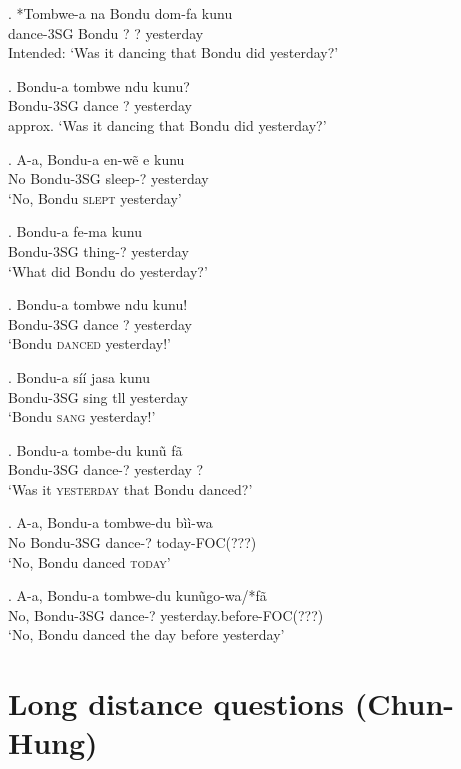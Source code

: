 \documentclass{assets/fieldnotes}
\begin{document}
{\exg. *Tombwe-a na Bondu dom-fa kunu\\
dance-3SG Bondu ? ? yesterday\\
Intended: `Was it dancing that Bondu did yesterday?'\\

\exg. Bondu-a tombwe ndu kunu?\\
Bondu-3SG dance ? yesterday\\
approx. `Was it dancing that Bondu did yesterday?'

\exg. A-a, Bondu-a en-wẽ e kunu\\
No Bondu-3SG sleep-? yesterday\\
`No, Bondu \textsc{slept} yesterday'

\exg. Bondu-a fe-ma kunu\\
Bondu-3SG thing-? yesterday\\
`What did Bondu do yesterday?'


\exg. Bondu-a tombwe ndu kunu!\\
Bondu-3SG dance ? yesterday\\
`Bondu \textsc{danced} yesterday!'

\exg. Bondu-a síí jasa kunu\\
Bondu-3SG sing tll yesterday\\
`Bondu \textsc{sang} yesterday!'

\exg. Bondu-a tombe-du kunũ fã\\
Bondu-3SG dance-? yesterday ?\\
`Was it \textsc{yesterday} that Bondu danced?'

\exg. A-a, Bondu-a tombwe-du bìì-wa\\
No Bondu-3SG dance-? today-FOC(???)\\
`No, Bondu danced \textsc{today}'

\exg. A-a, Bondu-a tombwe-du kunũgo-wa/*fã\\
No, Bondu-3SG dance-? yesterday.before-FOC(???)\\
`No, Bondu danced the day before yesterday'


\section{Long distance questions (Chun-Hung)}

}
\end{document}

